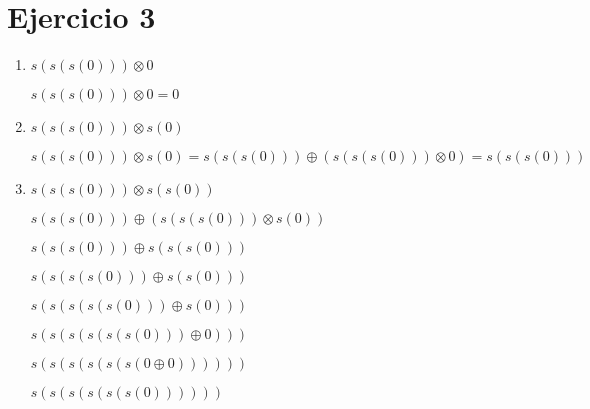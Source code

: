\documentclass{article}
\begin{document}
\section{Ejercicio 3}
\begin{enumerate}
    \item {$s(s(s(0)))\otimes 0$}
    \begin{center}
        $s(s(s(0))) \otimes 0 = 0$
    \end{center}
    \item {$s(s(s(0)))\otimes s(0)$}
    \begin{center}
        $s(s(s(0))) \otimes s(0) = s(s(s(0))) \oplus (s(s(s(0))) \otimes 0) = s(s(s(0)))$
    \end{center}
    \item {$s(s(s(0)))\otimes s(s(0))$}
   \begin{center}
       $s(s(s(0))) \oplus (s(s(s(0))) \otimes s(0))$
   \end{center}
   \begin{center}
       $s(s(s(0))) \oplus s(s(s(0)))$
   \end{center}
   \begin{center}
       $s(s(s(s(0))) \oplus s(s(0)))$
   \end{center}
   \begin{center}
       $s(s(s(s(s(0))) \oplus s(0)))$
   \end{center}
   \begin{center}
       $s(s(s(s(s(s(0))) \oplus 0)))$
      
   \end{center}
   \begin{center}
       $s(s(s(s(s(s(0 \oplus 0))))))$
   \end{center}
   \begin{center}
       $s(s(s(s(s(s(0))))))$
   \end{center}
\end{enumerate}
\end{document}
